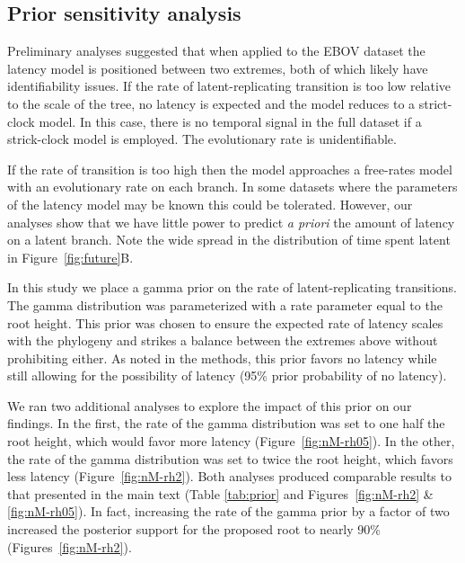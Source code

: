 \subsection*{Prior sensitivity analysis}

Preliminary analyses suggested that when applied to the EBOV dataset the latency model is positioned between two extremes, both of which likely have identifiability issues.
If the rate of latent-replicating transition is too low relative to the scale of the tree, no latency is expected and the model reduces to a strict-clock model.
In this case, there is no temporal signal in the full dataset if a strick-clock model is employed.
The evolutionary rate is unidentifiable.

If the rate of transition is too high then the model approaches a free-rates model with an evolutionary rate on each branch. 
In some datasets where the parameters of the latency model may be known this could be tolerated.
However, our analyses show that we have little power to predict \emph{a priori} the amount of latency on a latent branch.
Note the wide spread in the distribution of time spent latent in Figure~\ref{fig:future}B. 

In this study we place a gamma prior on the rate of latent-replicating transitions.
The gamma distribution was parameterized with a rate parameter equal to the root height.
This prior was chosen to ensure the expected rate of latency scales with the phylogeny and strikes a balance between the extremes above without prohibiting either.
As noted in the methods, this prior favors no latency while still allowing for the possibility of latency (95\% prior probability of no latency).

We ran two additional analyses to explore the impact of this prior on our findings.
In the first, the rate of the gamma distribution was set to one half the root height, which would favor more latency (Figure~\ref{fig:nM-rh05}).
In the other, the rate of the gamma distribution was set to twice the root height, which favors less latency (Figure~\ref{fig:nM-rh2}).
Both analyses produced comparable results to that presented in the main text (Table \ref{tab:prior} and Figures~\ref{fig:nM-rh2} \& \ref{fig:nM-rh05}).
In fact, increasing the rate of the gamma prior by a factor of two increased the posterior support for the proposed root to nearly 90\% (Figures~\ref{fig:nM-rh2}).

\begin{table}[!hbp]
    \centering
    
  \caption{\textbf{Prior sensitivity analysis.} Prior - the rate parameter of the gamma distribution placed on the latent rate. Root age- posterior mean and 95\% HPD of the root age. Clock rate- posterior mean and 95\% HPD of the evolutionary rate when replicating. Latent branches -  the median and 95\% HPD of the number of branches with at least one latent period.}
    \label{tab:prior}
\end{table}


